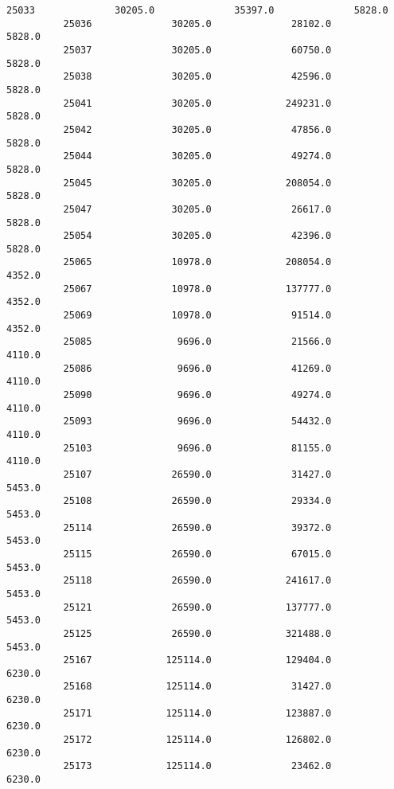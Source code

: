 \documentclass[11pt]{article}
\begin{document}
\begin{Verbatim}[commandchars=\\\{\}]
          25033              30205.0              35397.0              5828.0   
          25036              30205.0              28102.0              5828.0   
          25037              30205.0              60750.0              5828.0   
          25038              30205.0              42596.0              5828.0   
          25041              30205.0             249231.0              5828.0   
          25042              30205.0              47856.0              5828.0   
          25044              30205.0              49274.0              5828.0   
          25045              30205.0             208054.0              5828.0   
          25047              30205.0              26617.0              5828.0   
          25054              30205.0              42396.0              5828.0   
          25065              10978.0             208054.0              4352.0   
          25067              10978.0             137777.0              4352.0   
          25069              10978.0              91514.0              4352.0   
          25085               9696.0              21566.0              4110.0   
          25086               9696.0              41269.0              4110.0   
          25090               9696.0              49274.0              4110.0   
          25093               9696.0              54432.0              4110.0   
          25103               9696.0              81155.0              4110.0   
          25107              26590.0              31427.0              5453.0   
          25108              26590.0              29334.0              5453.0   
          25114              26590.0              39372.0              5453.0   
          25115              26590.0              67015.0              5453.0   
          25118              26590.0             241617.0              5453.0   
          25121              26590.0             137777.0              5453.0   
          25125              26590.0             321488.0              5453.0   
          25167             125114.0             129404.0              6230.0   
          25168             125114.0              31427.0              6230.0   
          25171             125114.0             123887.0              6230.0   
          25172             125114.0             126802.0              6230.0   
          25173             125114.0              23462.0              6230.0   
          

\end{Verbatim}
\end{document}
